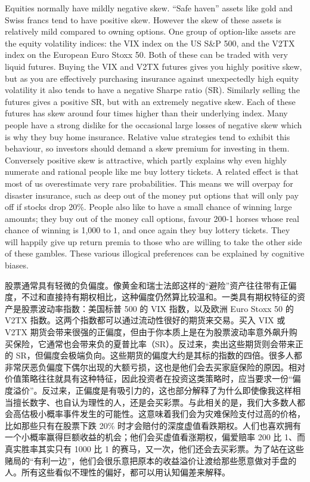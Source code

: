 \begin{englishblock} Equities normally have mildly negative skew. ``Safe haven'' assets like gold and Swiss francs tend to have positive skew. However the skew of these assets is relatively mild compared to owning options. One group of option-like assets are the equity volatility indices: the VIX index on the US S\&P 500, and the V2TX index on the European Euro Stoxx 50. Both of these can be traded with very liquid futures. Buying the VIX and V2TX futures gives you highly positive skew, but as you are effectively purchasing insurance against unexpectedly high equity volatility it also tends to have a negative Sharpe ratio (SR). Similarly selling the futures gives a positive SR, but with an extremely negative skew. Each of these futures has skew around four times higher than their underlying index. Many people have a strong dislike for the occasional large losses of negative skew which is why they buy home insurance. Relative value strategies tend to exhibit this behaviour, so investors should demand a skew premium for investing in them. Conversely positive skew is attractive, which partly explains why even highly numerate and rational people like me buy lottery tickets. A related effect is that most of us overestimate very rare probabilities. This means we will overpay for disaster insurance, such as deep out of the money put options that will only pay off if stocks drop 20\%. People also like to have a small chance of winning large amounts; they buy out of the money call options, favour 200-1 horses whose real chance of winning is 1,000 to 1, and once again they buy lottery tickets. They will happily give up return premia to those who are willing to take the other side of these gambles. These various illogical preferences can be explained by cognitive biases. \end{englishblock}

\begin{chineseblock}股票通常具有轻微的负偏度。像黄金和瑞士法郎这样的“避险”资产往往带有正偏度，不过和直接持有期权相比，这种偏度仍然算比较温和。一类具有期权特征的资产是股票波动率指数：美国标普 500 的 VIX 指数，以及欧洲 Euro Stoxx 50 的 V2TX 指数。这两个指数都可以通过流动性很好的期货来交易。买入 VIX 或 V2TX 期货会带来很强的正偏度，但由于你本质上是在为股票波动率意外飙升购买保险，它通常也会带来负的夏普比率（SR）。反过来，卖出这些期货则会带来正的 SR，但偏度会极端负向。这些期货的偏度大约是其标的指数的四倍。很多人都非常厌恶负偏度下偶尔出现的大额亏损，这也是他们会去买家庭保险的原因。相对价值策略往往就具有这种特征，因此投资者在投资这类策略时，应当要求一份“偏度溢价”。反过来，正偏度是有吸引力的，这也部分解释了为什么即使像我这样相当擅长数字、也自认为理性的人，还是会买彩票。与此相关的是，我们大多数人都会高估极小概率事件发生的可能性。这意味着我们会为灾难保险支付过高的价格，比如那些只有在股票下跌 20\% 时才会赔付的深度虚值看跌期权。人们也喜欢拥有一个小概率赢得巨额收益的机会；他们会买虚值看涨期权，偏爱赔率 200 比 1、而真实胜率其实只有 1000 比 1 的赛马，又一次，他们还会去买彩票。为了站在这些赌局的“有利一边”，他们会很乐意把原本的收益溢价让渡给那些愿意做对手盘的人。所有这些看似不理性的偏好，都可以用认知偏差来解释。\end{chineseblock}


